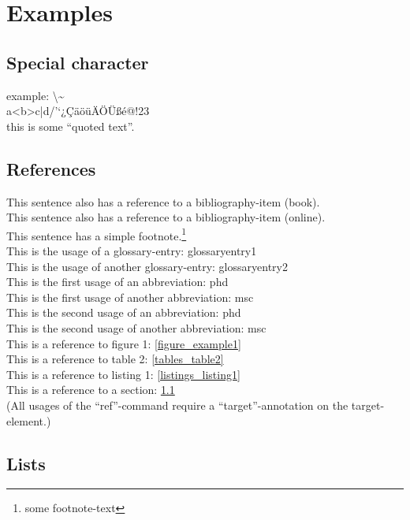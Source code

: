 
\chapter{Examples}

\section{Special character}\label{sec_specialcharacter}

example: \textbackslash \textasciitilde \\
a<b>c|d/'`¿ÇäöüÄÖÜßé@!23\\
this is some \enquote{quoted text}.


\section{References}

This sentence also has a reference to a bibliography-item (book).\cite{bib_zebk}\\
This sentence also has a reference to a bibliography-item (online).\cite{bib_amtoc}\\
This sentence has a simple footnote.\footnote{some footnote-text}\\
This is the usage of a glossary-entry: \gls{glossaryentry1}\\
This is the usage of another glossary-entry: \gls{glossaryentry2}\\
This is the first usage of an abbreviation: \gls{phd}\\
This is the first usage of another abbreviation: \gls{msc}\\
This is the second usage of an abbreviation: \gls{phd}\\
This is the second usage of another abbreviation: \gls{msc}\\
This is a reference to figure 1: \ref{figure_example1}\\
This is a reference to table 2: \ref{tables_table2}\\
This is a reference to listing 1: \ref{listings_listing1}\\
This is a reference to a section: \ref{sec_specialcharacter}\\
(All usages of the \enquote{ref}-command require a \enquote{target}-annotation on the target-element.)

\section{Lists}

